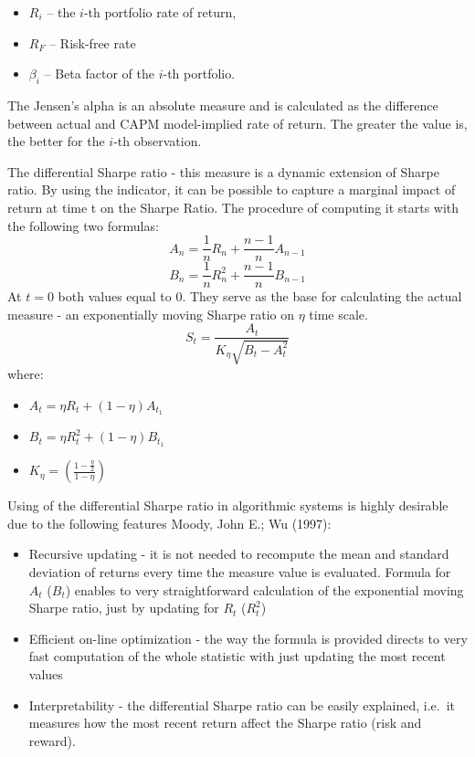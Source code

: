 \documentclass[]{article}
\providecommand{\tightlist}{%
  \setlength{\itemsep}{0pt}\setlength{\parskip}{0pt}}
\begin{document}
\begin{itemize}
\tightlist
\item
  \(R_i\) -- the \(i\)-th portfolio rate of return,
\item
  \(R_F\) -- Risk-free rate
\item
  \(\beta_i\) -- Beta factor of the \(i\)-th portfolio.
\end{itemize}

The Jensen's alpha is an absolute measure and is calculated as the
difference between actual and CAPM model-implied rate of return. The
greater the value is, the better for the \(i\)-th observation.

The differential Sharpe ratio - this measure is a dynamic extension of
Sharpe ratio. By using the indicator, it can be possible to capture a
marginal impact of return at time t on the Sharpe Ratio. The procedure
of computing it starts with the following two formulas: \[
A_n=\frac{1}{n}R_n+\frac{n-1}{n}A_{n-1}
\] \[
B_n=\frac{1}{n}R_n^2+\frac{n-1}{n}B_{n-1}
\] At \(t=0\) both values equal to 0. They serve as the base for
calculating the actual measure - an exponentially moving Sharpe ratio on
\(\eta\) time scale. \[
S_t=\frac{A_t}{K_\eta\sqrt{B_t-A_t^2}}
\] where:

\begin{itemize}
\tightlist
\item
  \(A_t=\eta R_t+(1-\eta)A_{t_1}\)
\item
  \(B_t=\eta R_t^2+(1-\eta)B_{t_1}\)
\item
  \(K_\eta=(\frac{1-\frac{\eta}{2}}{1-\eta})\)
\end{itemize}

Using of the differential Sharpe ratio in algorithmic systems is highly
desirable due to the following features Moody, John E.; Wu (1997):

\begin{itemize}
\tightlist
\item
  Recursive updating - it is not needed to recompute the mean and
  standard deviation of returns every time the measure value is
  evaluated. Formula for \(A_t\) (\(B_t\)) enables to very
  straightforward calculation of the exponential moving Sharpe ratio,
  just by updating for \(R_t\) (\(R_t^2\))
\item
  Efficient on-line optimization - the way the formula is provided
  directs to very fast computation of the whole statistic with just
  updating the most recent values
\item
  Interpretability - the differential Sharpe ratio can be easily
  explained, i.e.~it measures how the most recent return affect the
  Sharpe ratio (risk and reward).
\end{itemize}
\end{document}
